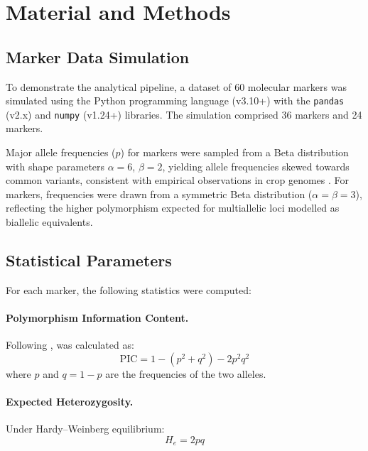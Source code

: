 
\section{Material and Methods}
\label{sec:methods}

\subsection{Marker Data Simulation}
\label{sec:sim}

To demonstrate the analytical pipeline, a dataset of 60 molecular markers
was simulated using the Python programming language (v3.10+) with the
\texttt{pandas} (v2.x) and \texttt{numpy} (v1.24+) libraries.
The simulation comprised 36 \snp{} markers and 24 \ssr{} markers.

Major allele frequencies ($p$) for \snp{} markers were sampled from a
Beta distribution with shape parameters $\alpha = 6$, $\beta = 2$, yielding
allele frequencies skewed towards common variants, consistent with
empirical observations in crop genomes \autocite{Elshire2011}. For
\ssr{} markers, frequencies were drawn from a symmetric Beta distribution
($\alpha = \beta = 3$), reflecting the higher polymorphism expected for
multiallelic loci modelled as biallelic equivalents.

\subsection{Statistical Parameters}
\label{sec:stats}

For each marker, the following statistics were computed:

\paragraph{Polymorphism Information Content.}
Following \textcite{Botstein1980}, \pic{} was calculated as:
\begin{equation}
    \text{PIC} = 1 - \left(p^2 + q^2\right) - 2p^2q^2
    \label{eq:pic}
\end{equation}
where $p$ and $q = 1 - p$ are the frequencies of the two alleles.

\paragraph{Expected Heterozygosity.}
Under Hardy--Weinberg equilibrium:
\begin{equation}
    H_e = 2pq
    \label{eq:he}
\end{equation}

